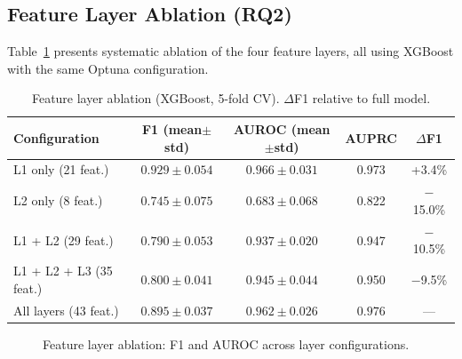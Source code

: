 \documentclass[runningheads]{llncs}
\begin{document}
\subsection{Feature Layer Ablation (RQ2)}
\label{sec:ablation}

Table~\ref{tab:ablation} presents systematic ablation of the four feature layers, all using XGBoost with the same Optuna configuration.

\begin{table}[t]
\centering
\caption{Feature layer ablation (XGBoost, 5-fold CV). $\Delta$F1 relative to full model.}
\label{tab:ablation}
\begin{tabular}{lcccc}
\toprule
\textbf{Configuration} & \textbf{F1 (mean$\pm$std)} & \textbf{AUROC (mean$\pm$std)} & \textbf{AUPRC} & \textbf{$\Delta$F1} \\
\midrule
L1 only (21 feat.) & $\mathbf{0.929\pm0.054}$ & $0.966\pm0.031$ & 0.973 & +3.4\% \\
L2 only (8 feat.)  & $0.745\pm0.075$ & $0.683\pm0.068$ & 0.822 & $-$15.0\% \\
L1 + L2 (29 feat.) & $0.790\pm0.053$ & $0.937\pm0.020$ & 0.947 & $-$10.5\% \\
L1 + L2 + L3 (35 feat.) & $0.800\pm0.041$ & $0.945\pm0.044$ & 0.950 & $-$9.5\% \\
All layers (43 feat.)    & $0.895\pm0.037$ & $\mathbf{0.962\pm0.026}$ & $\mathbf{0.976}$ & --- \\
\bottomrule
\end{tabular}
\end{table}

\begin{figure}[t]
\centering
{}
\caption{Feature layer ablation: F1 and AUROC across layer configurations.}
\label{fig:ablation}
\end{figure}
\end{document}
